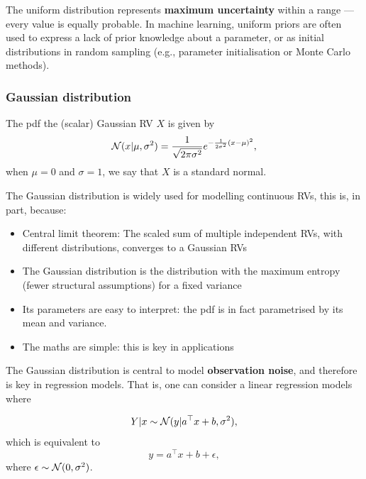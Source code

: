 \begin{mdframed}[style=discusion, frametitle={Uniform likelihood}]
The uniform distribution represents \textbf{maximum uncertainty} within a range — every value is equally probable.
In machine learning, uniform priors are often used to express a lack of prior knowledge about a parameter, or as
initial distributions in random sampling (e.g., parameter initialisation or Monte Carlo methods).
\end{mdframed}


\subsubsection{Gaussian distribution}
\label{cap:prob_Gaussian}

The pdf the (scalar) Gaussian RV $X$ is given by 
\begin{equation}
	{\mathcal N}(x|\mu,\sigma^2) = \frac{1}{\sqrt{2\pi\sigma^2}}e^{-\frac{1}{2\sigma^2}(x-\mu)^2},
\end{equation}
when $\mu=0$ and $\sigma=1$, we say that $X$ is a standard normal. 

\begin{mdframed}[style=discusion, frametitle={Why Gaussian}]

The Gaussian distribution is widely used for modelling continuous RVs, this is, in part, because: 

\begin{itemize}
	\item Central limit theorem: The scaled sum of multiple independent RVs, with different distributions, converges to a Gaussian RVs
	\item The Gaussian distribution is the distribution with the maximum entropy (fewer structural assumptions) for a fixed variance
	\item Its parameters are easy to interpret: the pdf is in fact parametrised by its mean and variance.
	\item The maths are simple: this is key in applications
\end{itemize}

\end{mdframed}

The Gaussian distribution is central to model \textbf{observation noise}, and therefore is key in regression models. That is, one can consider a linear regression models where

\begin{equation}
	Y|x \sim {\mathcal N}(y|a^\top x + b,\sigma^2),
\end{equation}
which is equivalent to 
\begin{equation}
	y = a^\top x + b + \epsilon,
\end{equation}
where $\epsilon \sim {\mathcal N}(0,\sigma^2)$.

